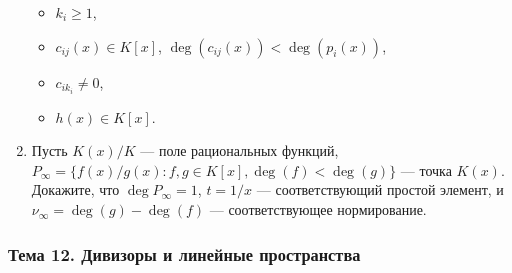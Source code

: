 \documentclass[a4paper, 12pt]{article}
\begin{document}
\begin{enumerate}[noitemsep,topsep=0pt]
\begin{itemize}[noitemsep,topsep=0pt]
        \item $k_i\geqslant 1$,
        \item $c_{ij}(x)\in K[x]$, $\deg(c_{ij}(x))<\deg(p_i(x))$,
        \item $c_{ik_i}\neq 0$,
        \item $h(x)\in K[x]$.
    \end{itemize} %
    \item Пусть $K(x)/K$ --- поле рациональных функций, $P_\infty=\{f(x)/g(x): f,g \in K[x], \deg(f)<\deg(g)\}$ --- точка $K(x)$. Докажите, что $\deg P_\infty = 1$, $t=1/x$ ---  соответствующий простой элемент, и $\nu_\infty = \deg(g) - \deg(f)$ --- соответствующее нормирование. %
\end{enumerate}

\subsubsection{Тема 12. Дивизоры и линейные пространства}
\end{document}
